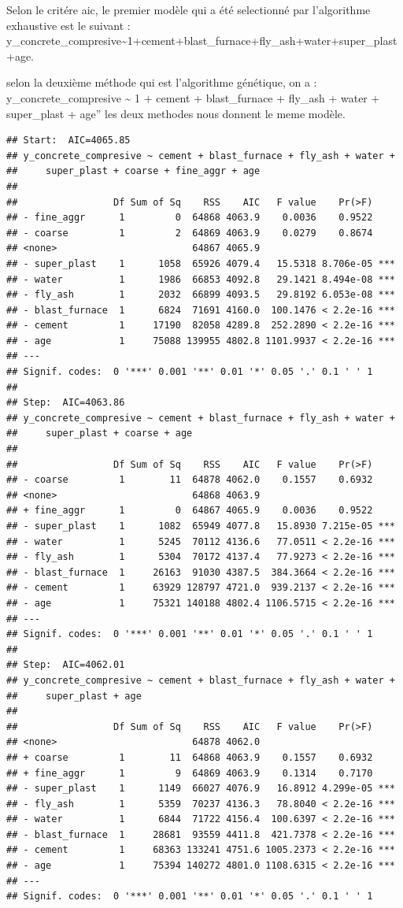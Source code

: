 \documentclass[
  12pt,
]{article}
\begin{document}
Selon le critére aic, le premier modèle qui a été selectionné par
l'algorithme exhaustive est le suivant :
y\_concrete\_compresive\textasciitilde1+cement+blast\_furnace+fly\_ash+water+super\_plast+age.

selon la deuxième méthode qui est l'algorithme génétique, on a :
y\_concrete\_compresive \textasciitilde{} 1 + cement + blast\_furnace +
fly\_ash + water + super\_plast + age'' les deux methodes nous donnent
le meme modèle.

\begin{verbatim}
## Start:  AIC=4065.85
## y_concrete_compresive ~ cement + blast_furnace + fly_ash + water + 
##     super_plast + coarse + fine_aggr + age
## 
##                 Df Sum of Sq    RSS    AIC   F value    Pr(>F)    
## - fine_aggr      1         0  64868 4063.9    0.0036    0.9522    
## - coarse         1         2  64869 4063.9    0.0279    0.8674    
## <none>                        64867 4065.9                        
## - super_plast    1      1058  65926 4079.4   15.5318 8.706e-05 ***
## - water          1      1986  66853 4092.8   29.1421 8.494e-08 ***
## - fly_ash        1      2032  66899 4093.5   29.8192 6.053e-08 ***
## - blast_furnace  1      6824  71691 4160.0  100.1476 < 2.2e-16 ***
## - cement         1     17190  82058 4289.8  252.2890 < 2.2e-16 ***
## - age            1     75088 139955 4802.8 1101.9937 < 2.2e-16 ***
## ---
## Signif. codes:  0 '***' 0.001 '**' 0.01 '*' 0.05 '.' 0.1 ' ' 1
## 
## Step:  AIC=4063.86
## y_concrete_compresive ~ cement + blast_furnace + fly_ash + water + 
##     super_plast + coarse + age
## 
##                 Df Sum of Sq    RSS    AIC   F value    Pr(>F)    
## - coarse         1        11  64878 4062.0    0.1557    0.6932    
## <none>                        64868 4063.9                        
## + fine_aggr      1         0  64867 4065.9    0.0036    0.9522    
## - super_plast    1      1082  65949 4077.8   15.8930 7.215e-05 ***
## - water          1      5245  70112 4136.6   77.0511 < 2.2e-16 ***
## - fly_ash        1      5304  70172 4137.4   77.9273 < 2.2e-16 ***
## - blast_furnace  1     26163  91030 4387.5  384.3664 < 2.2e-16 ***
## - cement         1     63929 128797 4721.0  939.2137 < 2.2e-16 ***
## - age            1     75321 140188 4802.4 1106.5715 < 2.2e-16 ***
## ---
## Signif. codes:  0 '***' 0.001 '**' 0.01 '*' 0.05 '.' 0.1 ' ' 1
## 
## Step:  AIC=4062.01
## y_concrete_compresive ~ cement + blast_furnace + fly_ash + water + 
##     super_plast + age
## 
##                 Df Sum of Sq    RSS    AIC   F value    Pr(>F)    
## <none>                        64878 4062.0                        
## + coarse         1        11  64868 4063.9    0.1557    0.6932    
## + fine_aggr      1         9  64869 4063.9    0.1314    0.7170    
## - super_plast    1      1149  66027 4076.9   16.8912 4.299e-05 ***
## - fly_ash        1      5359  70237 4136.3   78.8040 < 2.2e-16 ***
## - water          1      6844  71722 4156.4  100.6397 < 2.2e-16 ***
## - blast_furnace  1     28681  93559 4411.8  421.7378 < 2.2e-16 ***
## - cement         1     68363 133241 4751.6 1005.2373 < 2.2e-16 ***
## - age            1     75394 140272 4801.0 1108.6315 < 2.2e-16 ***
## ---
## Signif. codes:  0 '***' 0.001 '**' 0.01 '*' 0.05 '.' 0.1 ' ' 1
\end{verbatim}
\end{document}

